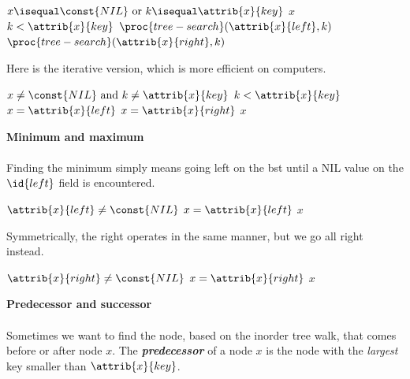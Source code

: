 \documentclass{article}
\begin{document}
\begin{codebox}
\li \If $x \isequal \const{NIL} \text{ or } k \isequal \attrib{x}{key}$
\li \Then
        \Return $x$
    \End
\li \If $k < \attrib{x}{key}$ 
\li \Then
        \Return $\proc{tree-search}(\attrib{x}{left}, k)$
\li \Else
\li     \Return $\proc{tree-search}(\attrib{x}{right}, k)$
    \End
\end{codebox}

Here is the iterative version, which is more efficient on computers.

\begin{codebox}
\li \While $x \neq \const{NIL} \text{ and } k \neq \attrib{x}{key}$
    \Do
\li     \If $k < \attrib{x}{key}$ 
        \Then
\li         $x = \attrib{x}{left}$
\li     \Else
\li         $x = \attrib{x}{right}$ 
        \End
    \End
\li \Return $x$
\end{codebox}

\textbf{Minimum and maximum}
\\ \\
Finding the minimum simply means going left on the bst until a NIL value on the $\id{left}$ field is encountered.

\begin{codebox}
\li \While $\attrib{x}{left} \neq \const{NIL}$
    \Do
    \li     $x = \attrib{x}{left}$
    \End
\li \Return $x$
\end{codebox}

Symmetrically, the right operates in the same manner, but we go all right instead.

\begin{codebox}
\li \While $\attrib{x}{right} \neq \const{NIL}$
    \Do
    \li     $x = \attrib{x}{right}$
    \End
\li \Return $x$
\end{codebox}

\newpage

\textbf{Predecessor and successor}
\\ \\
Sometimes we want to find the node, based on the inorder tree walk, that comes before or after node $x$. The \textbf{\emph{predecessor}} of a node $x$ is the node with the \textit{largest} key smaller than $\attrib{x}{key}$. 
\end{document}

